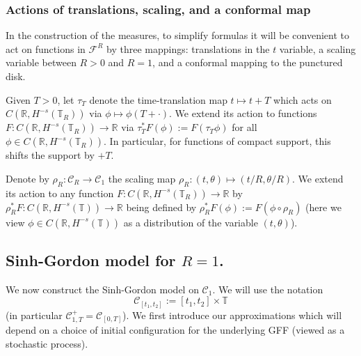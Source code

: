 \documentclass[11pt]{amsart}
\numberwithin{equation}{section}
\theoremstyle{definition}
\newcommand{\mc}{\mathcal}
\def\T{\mathbb{T}}
\begin{document}
 
 
\subsubsection{Actions of translations, scaling, and a conformal map} 

In the construction of the measures, to simplify formulas it will be convenient to act on functions in $\mathcal{F}^R$ by three mappings: translations in the $t$ variable, a scaling variable between $R>0$ and $R=1$, and a conformal mapping to the punctured disk.   

Given $T>0$, let $\tau_T$ denote the time-translation map $t \mapsto t+T$ which acts on $C(\mathbb{R}, H^{-s}(\T_R))$ via $\phi \mapsto \phi(T+\cdot)$. We extend its action to functions $F:C(\mathbb{R}, H^{-s}(\T_R)) \rightarrow \mathbb{R}$ via  $\tau_T^*F(\phi) := F(\tau_T \phi)$ for all $\phi \in C(\mathbb{R}, H^{-s}(\T_R))$. In particular, for functions of compact support, this shifts the support by $+T$.

Denote by $\rho_R:\mathcal{C}_R \rightarrow \mathcal{C}_1$ the scaling map $\rho_R:(t,\theta) \mapsto (t/R, \theta/R)$. 
We extend its action to any function $F:C(\mathbb{R}, H^{-s}(\T_R)) \rightarrow \mathbb{R}$ by 
$\rho_R^*F: C(\mathbb{R}, H^{-s}(\T)) \rightarrow \mathbb{R}$ being defined by 
$\rho_R^*F(\phi):=F(\phi\circ \rho_R)$ (here we view $\phi \in C(\mathbb{R}, H^{-s}(\T))$ as a distribution of 
the variable $(t,\theta)$).


\subsection{Sinh-Gordon model for $R=1$.} \label{subsec: construction sinh 2pi}


We now construct the Sinh-Gordon model on $\mathcal{C}_1$. We will use the notation 
\[\mc{C}_{[t_1,t_2]}:= [t_1,t_2]\times \T\] 
(in particular $\mc{C}^+_{1,T}=\mc{C}_{[0,T]}$).
We first introduce our approximations which will depend on a choice of initial configuration for the underlying GFF (viewed as a stochastic process).
\end{document}
